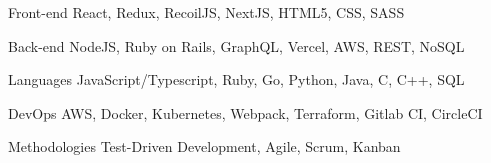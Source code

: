 

\begin{cvskills}
  
  \cvskill
    {Front-end} %
    {React, Redux, RecoilJS, NextJS, HTML5, CSS, SASS} %

  \cvskill
    {Back-end} %
    {NodeJS, Ruby on Rails, GraphQL, Vercel, AWS, REST, NoSQL} %

  \cvskill
    {Languages} %
    {JavaScript/Typescript, Ruby, Go, Python, Java, C, C++, SQL} %

  \cvskill
    {DevOps} %
    {AWS, Docker, Kubernetes, Webpack, Terraform, Gitlab CI, CircleCI} %

  \cvskill
    {Methodologies} %
    {Test-Driven Development, Agile, Scrum, Kanban} %

\end{cvskills}
